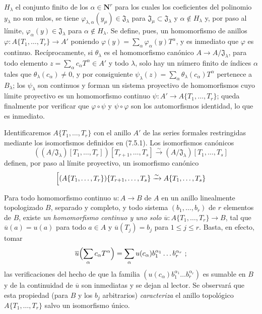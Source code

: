 \begin{env}[7.5.1]
$H_\lambda$ el conjunto finito de los $\alpha\in\mathbf{N}^r$ para los cuales los
coeficientes del polinomio $y_\lambda$ no son nulos, se tiene
$\varphi_{\lambda,\alpha}(y_\mu)\in\mathfrak J_\lambda$ para
$\mathfrak J_\mu\subset\mathfrak J_\lambda$ y $\alpha\notin H_\lambda$ y,
por paso al límite, $\varphi_\alpha(y)\in\mathfrak J_\lambda$ para
$\alpha\notin H_\lambda$. Se define, pues, un homomorfismo de anillos
$\varphi:A\{T_1,\ldots,T_r\}\to A'$ poniendo
$\varphi(y)=\sum_\alpha\varphi_\alpha(y)T^\alpha$, y es inmediato que
$\varphi$ es continuo. Recíprocamente, si $\theta_\lambda$ es el homomorfismo
canónico $A\to A/\mathfrak J_\lambda$, para todo elemento
$z=\sum_\alpha c_\alpha T^\alpha\in A'$ y todo $\lambda$, solo hay un
número finito de índices $\alpha$ tales que $\theta_\lambda(c_\alpha)\neq0$, y
por consiguiente
$\psi_\lambda(z)=\sum_\alpha\theta_\lambda(c_\alpha)T^\alpha$ pertenece a
$B_\lambda$; los $\psi_\lambda$ son continuos y forman un sistema
proyectivo de homomorfismos cuyo límite proyectivo es un homomorfismo
continuo $\psi:A'\to A\{T_1,\ldots,T_r\}$; queda finalmente por verificar que
$\varphi\circ\psi$ y $\psi\circ\varphi$ son los automorfismos identidad,
lo que es inmediato.
\end{env}

\begin{env}[7.5.2]
\label{0.7.5.2-fr}
Identificaremos $A\{T_1,\ldots,T_r\}$ con el anillo $A'$ de las series formales
restringidas mediante los isomorfismos definidos en (7.5.1). Los isomorfismos
canónicos
\[
  ((A/\mathfrak J_\lambda)[T_1,\ldots,T_r])
  [T_{r+1},\ldots,T_s]
  \xrightarrow{\sim}
  (A/\mathfrak J_\lambda)[T_1,\ldots,T_s]
\]
definen, por paso al límite proyectivo, un isomorfismo canónico
\[
  \Bigl[(A\{T_1,\ldots,T_r\})\{T_{r+1},\ldots,T_s\}
  \xrightarrow{\sim}
  A\{T_1,\ldots,T_s\}
\]
\end{env}

\begin{env}[7.5.3]
\label{0.7.5.3-fr}
Para todo homomorfismo continuo $u:A\to B$ de $A$ en un anillo linealmente
topologizado $B$, separado y completo, y todo sistema $(b_1,\ldots,b_r)$ de $r$
elementos de $B$, existe \emph{un homomorfismo continuo y uno solo}
$\overline u:A\{T_1,\ldots,T_r\}\to B$, tal que $\overline u(a)=u(a)$ para
todo $a\in A$ y $\overline u(T_j)=b_j$ para $1\leq j\leq r$. Basta, en
efecto, tomar
\[
  \overline u\Bigl(\sum_\alpha c_\alpha T^\alpha\Bigr)
  =\sum_\alpha u(c_\alpha)b_1^{\alpha_1}\ldots b_r^{\alpha_r}~;
\]
las verificaciones del hecho de que la familia
$(u(c_\alpha)b_1^{\alpha_1}\ldots b_r^{\alpha_r})$ es sumable en $B$ y
de la continuidad de $\overline u$ son inmediatas y se dejan al lector. Se
observará que esta propiedad (para $B$ y los $b_j$ arbitrarios)
\emph{caracteriza} el anillo topológico $A\{T_1,\ldots,T_r\}$ salvo un
isomorfismo único.
\end{env}

